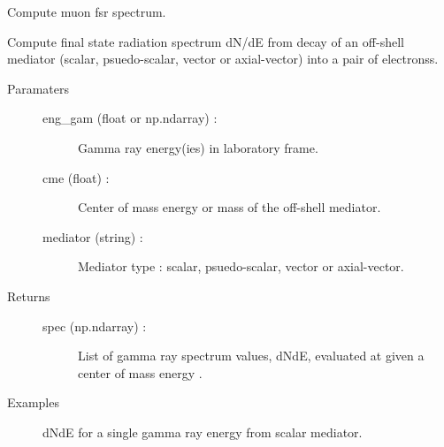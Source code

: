 \documentclass[letterpaper,10pt,english]{sphinxmanual}
\begin{document}
\begin{fulllineitems}
\label{\detokenize{modules:hazma.electron.fsr}}
Compute muon fsr spectrum.

Compute final state radiation spectrum dN/dE from decay of an off-shell
mediator (scalar, psuedo-scalar, vector or axial-vector) into a pair of
electronss.
\begin{description}
\item[{Paramaters}] \leavevmode\begin{description}
\item[{eng\_gam (float or np.ndarray) :}] \leavevmode
Gamma ray energy(ies) in laboratory frame.

\item[{cme (float) :}] \leavevmode
Center of mass energy or mass of the off-shell mediator.

\item[{mediator (string) :}] \leavevmode
Mediator type : scalar, psuedo-scalar, vector or axial-vector.

\end{description}

\item[{Returns}] \leavevmode\begin{description}
\item[{spec (np.ndarray) :}] \leavevmode
List of gamma ray spectrum values, dNdE, evaluated at 
given a center of mass energy .

\end{description}

\item[{Examples}] \leavevmode
dNdE for a single gamma ray energy from scalar mediator.

\begin{sphinxVerbatim}[commandchars=\\\{\}]
   
    
    
\end{sphinxVerbatim}


\end{description}
\end{fulllineitems}
\end{document}
